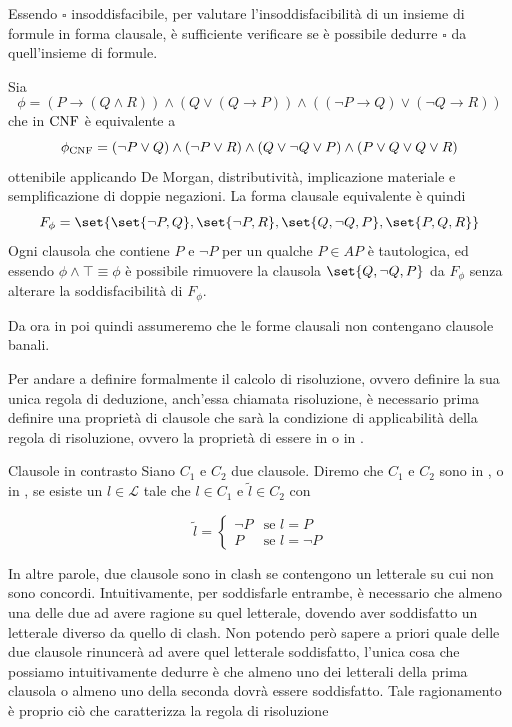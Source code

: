 Essendo \(\square\) insoddisfacibile, per valutare l'insoddisfacibilità di un insieme di formule in forma clausale, è sufficiente verificare se è possibile dedurre \(\square\) da quell'insieme di formule.

\begin{example}{}
  Sia 
  \[\phi=(P\to(Q\land R))\land(Q\lor(Q\to P)) \land((\neg P \to Q)\lor(\neg Q \to R))\]
  che in \(\operatorname{CNF}\) è equivalente a
  \[\phi_{\operatorname{CNF}} = (\neg P\lor Q)\land(\neg P\lor R)\land(Q\lor \neg Q \lor P)\land(P\lor Q \lor Q \lor R)\]
  ottenibile applicando De Morgan, distributività, implicazione materiale e semplificazione di doppie negazioni.
  La forma clausale equivalente è quindi
  \[F_\phi = \set{\set{\neg P, Q},\set{\neg P, R},\set{Q, \neg Q, P},\set{P, Q, R}}\]
  Ogni clausola che contiene \(P\) e \(\neg P\) per un qualche \(P \in AP\) è tautologica, ed essendo \(\phi\land\top\equiv\phi\) è possibile rimuovere la clausola \(\set{Q, \neg Q, P}\) da \(F_\phi\) senza alterare la soddisfacibilità di \(F_\phi\).

  Da ora in poi quindi assumeremo che le forme clausali non contengano clausole banali.
\end{example}

Per andare a definire formalmente il calcolo di risoluzione, ovvero definire la sua unica regola di deduzione, anch'essa chiamata risoluzione, è necessario prima definire una proprietà di clausole che sarà la condizione di applicabilità della regola di risoluzione, ovvero la proprietà di essere in  o in .

\begin{definition}{Clausole in contrasto}
  Siano \(C_1\) e \(C_2\) due clausole. Diremo che \(C_1\) e \(C_2\) sono in , o in , se esiste un \(l \in \mathcal{L}\) tale che \(l \in C_1\) e \(\tilde{l} \in C_2\) con
  
  \[\tilde{l} = \begin{cases}
                \neg P & \text{se } l = P\\
                P & \text{se } l = \neg P
              \end{cases}
  \]
\end{definition}

In altre parole, due clausole sono in clash se contengono un letterale su cui non sono concordi. Intuitivamente, per soddisfarle entrambe, è necessario che almeno una delle due  ad avere ragione su quel letterale, dovendo aver soddisfatto un letterale diverso da quello di clash. Non potendo però sapere a priori quale delle due clausole rinuncerà ad avere quel letterale soddisfatto, l'unica cosa che possiamo intuitivamente dedurre è che almeno uno dei letterali della prima clausola o almeno uno della seconda dovrà essere soddisfatto. Tale ragionamento è proprio ciò che caratterizza la regola di risoluzione

